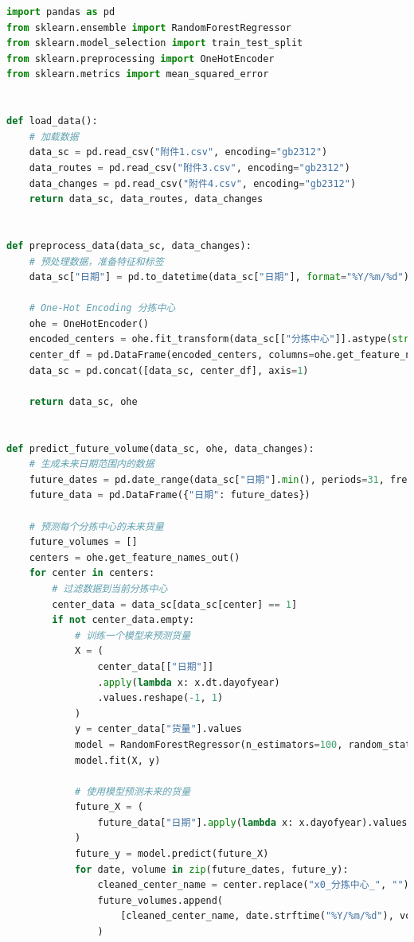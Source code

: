 \documentclass[UTF8,a4paper,10 pt]{article}%
\begin{document}
\begin{lstlisting}[language=python]
import pandas as pd
from sklearn.ensemble import RandomForestRegressor
from sklearn.model_selection import train_test_split
from sklearn.preprocessing import OneHotEncoder
from sklearn.metrics import mean_squared_error


def load_data():
    # 加载数据
    data_sc = pd.read_csv("附件1.csv", encoding="gb2312")
    data_routes = pd.read_csv("附件3.csv", encoding="gb2312")
    data_changes = pd.read_csv("附件4.csv", encoding="gb2312")
    return data_sc, data_routes, data_changes


def preprocess_data(data_sc, data_changes):
    # 预处理数据，准备特征和标签
    data_sc["日期"] = pd.to_datetime(data_sc["日期"], format="%Y/%m/%d")

    # One-Hot Encoding 分拣中心
    ohe = OneHotEncoder()
    encoded_centers = ohe.fit_transform(data_sc[["分拣中心"]].astype(str)).toarray()
    center_df = pd.DataFrame(encoded_centers, columns=ohe.get_feature_names_out())
    data_sc = pd.concat([data_sc, center_df], axis=1)

    return data_sc, ohe


def predict_future_volume(data_sc, ohe, data_changes):
    # 生成未来日期范围内的数据
    future_dates = pd.date_range(data_sc["日期"].min(), periods=31, freq="D")
    future_data = pd.DataFrame({"日期": future_dates})

    # 预测每个分拣中心的未来货量
    future_volumes = []
    centers = ohe.get_feature_names_out()
    for center in centers:
        # 过滤数据到当前分拣中心
        center_data = data_sc[data_sc[center] == 1]
        if not center_data.empty:
            # 训练一个模型来预测货量
            X = (
                center_data[["日期"]]
                .apply(lambda x: x.dt.dayofyear)
                .values.reshape(-1, 1)
            )
            y = center_data["货量"].values
            model = RandomForestRegressor(n_estimators=100, random_state=42)
            model.fit(X, y)

            # 使用模型预测未来的货量
            future_X = (
                future_data["日期"].apply(lambda x: x.dayofyear).values.reshape(-1, 1)
            )
            future_y = model.predict(future_X)
            for date, volume in zip(future_dates, future_y):
                cleaned_center_name = center.replace("x0_分拣中心_", "")
                future_volumes.append(
                    [cleaned_center_name, date.strftime("%Y/%m/%d"), volume]
                )


\end{lstlisting}
\end{document}
